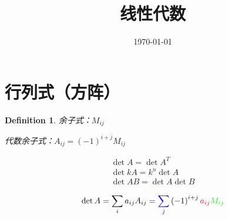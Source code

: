 \documentclass{article}
\title{线性代数}
\author{}
\date{\today}
\begin{document}
\hypersetup{
    hidelinks,
    allcolors = black,
    breaklinks = true
}

\newtheorem{definition}{Definition}[subsection]
\newtheorem{theorem}{Theorem}[subsection]
\newtheorem{corollary}{Corollary}[theorem]
\renewcommand{\proofname}{\indent\bf Proof}

\def\v{\boldsymbol v}
\def\w{\boldsymbol w}
\def\ev{\boldsymbol e}
\def\pv{\boldsymbol p}

\newcommand{\abs}[1]{\left|#1\right|}
\newcommand{\p}[1]{\left(#1\right)}

\begin{titlepage}
    \maketitle
\end{titlepage}

\tableofcontents
\newpage

\section{行列式（方阵）}

\begin{definition}
    余子式：$M_{ij}$

    代数余子式：$A_{ij}=\p{-1}^{i+j}M_{ij}$
\end{definition}

\[\begin{gathered}
        \det A=\det A^T\\
        \det kA=k^n\det A\\
        \det AB=\det A\det B
    \end{gathered}\]

\[\det A=\sum_ia_{ij}A_{ij}={\textcolor{blue}{\sum_j}}\p{-1}^{i+j}\textcolor{red}{a_{ij}}\textcolor{green}{M_{ij}}\]
\end{document}
